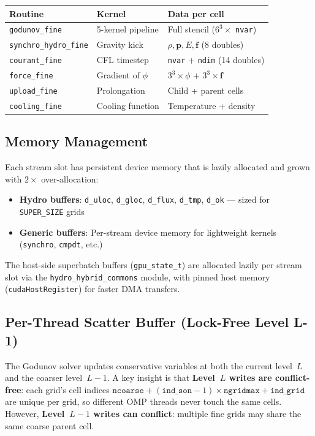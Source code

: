 \documentclass[11pt,fleqn]{book}
\begin{document}
\begin{center}
\begin{tabular}{lll}
\toprule
\textbf{Routine} & \textbf{Kernel} & \textbf{Data per cell} \\
\midrule
\texttt{godunov\_fine}           & 5-kernel pipeline  & Full stencil ($6^3 \times$ \texttt{nvar}) \\
\texttt{synchro\_hydro\_fine}    & Gravity kick       & $\rho, \mathbf{p}, E, \mathbf{f}$ (8 doubles) \\
\texttt{courant\_fine}           & CFL timestep       & \texttt{nvar} + \texttt{ndim} (14 doubles) \\
\texttt{force\_fine}             & Gradient of $\phi$ & $3^3 \times \phi$ + $3^3 \times \mathbf{f}$ \\
\texttt{upload\_fine}            & Prolongation       & Child + parent cells \\
\texttt{cooling\_fine}           & Cooling function   & Temperature + density \\
\bottomrule
\end{tabular}
\end{center}

\subsection{Memory Management}

Each stream slot has persistent device memory that is lazily allocated and grown with $2\times$ over-allocation:
\begin{itemize}[nosep]
\item \textbf{Hydro buffers}: \texttt{d\_uloc}, \texttt{d\_gloc}, \texttt{d\_flux}, \texttt{d\_tmp}, \texttt{d\_ok} --- sized for \texttt{SUPER\_SIZE} grids
\item \textbf{Generic buffers}: Per-stream device memory for lightweight kernels (\texttt{synchro}, \texttt{cmpdt}, etc.)
\end{itemize}

The host-side superbatch buffers (\texttt{gpu\_state\_t}) are allocated lazily per stream slot via the \texttt{hydro\_hybrid\_commons} module, with pinned host memory (\texttt{cudaHostRegister}) for faster DMA transfers.

\subsection{Per-Thread Scatter Buffer (Lock-Free Level L-1)}

The Godunov solver updates conservative variables at both the current level~$L$ and the coarser level~$L{-}1$.  A key insight is that \textbf{Level~$L$ writes are conflict-free}: each grid's cell indices $\texttt{ncoarse} + (\texttt{ind\_son}-1) \times \texttt{ngridmax} + \texttt{ind\_grid}$ are unique per grid, so different OMP threads never touch the same cells.  However, \textbf{Level~$L{-}1$ writes can conflict}: multiple fine grids may share the same coarse parent cell.
\end{document}
